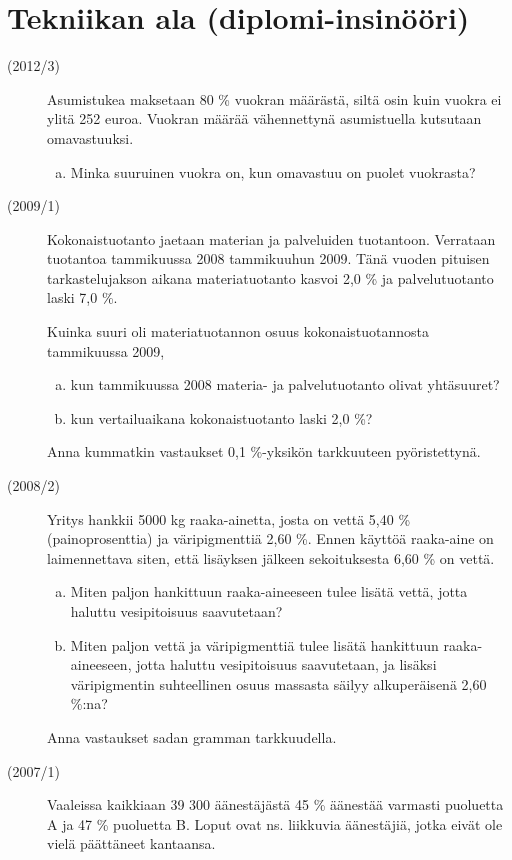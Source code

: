 \section{Tekniikan ala (diplomi-insinööri)}
\begin{description}
	\item[(2012/3)] Asumistukea maksetaan 80 \% vuokran määrästä, siltä osin kuin vuokra ei ylitä 252 euroa. Vuokran määrää vähennettynä asumistuella kutsutaan omavastuuksi.
		\begin{enumerate}[(a)]
			\item Minka suuruinen vuokra on, kun omavastuu on puolet vuokrasta?
		\end{enumerate}
	
	\item[(2009/1)] Kokonaistuotanto jaetaan materian ja palveluiden tuotantoon. Verrataan tuotantoa tammikuussa 2008 tammikuuhun 2009. Tänä vuoden pituisen tarkastelujakson aikana materiatuotanto kasvoi 2,0 \% ja palvelutuotanto laski 7,0 \%.
	
	Kuinka suuri oli materiatuotannon osuus kokonaistuotannosta tammikuussa 2009,
	\begin{enumerate}[(a)]
		\item kun tammikuussa 2008 materia- ja palvelutuotanto olivat yhtäsuuret?
		\item kun vertailuaikana kokonaistuotanto laski 2,0 \%?
	\end{enumerate}
	Anna kummatkin vastaukset 0,1 \%-yksikön tarkkuuteen pyöristettynä.

	\item[(2008/2)] Yritys hankkii 5000 kg raaka-ainetta, josta on vettä 5,40 \% (painoprosenttia) ja väripigmenttiä 2,60 \%. Ennen käyttöä raaka-aine on laimennettava siten, että lisäyksen jälkeen sekoituksesta 6,60 \% on vettä.
	
	\begin{enumerate}[(a)]
		\item Miten paljon hankittuun raaka-aineeseen tulee lisätä vettä, jotta haluttu vesipitoisuus saavutetaan?
		\item Miten paljon vettä ja väripigmenttiä tulee lisätä hankittuun raaka-aineeseen, jotta haluttu vesipitoisuus saavutetaan, ja lisäksi väripigmentin suhteellinen osuus massasta säilyy alkuperäisenä 2,60 \%:na?
	\end{enumerate}
	Anna vastaukset sadan gramman tarkkuudella.

	\item[(2007/1)] Vaaleissa kaikkiaan 39 300 äänestäjästä 45 \% äänestää varmasti puoluetta A ja 47 \% puoluetta B. Loput ovat ns. liikkuvia äänestäjiä, jotka eivät ole vielä päättäneet kantaansa.
	

\end{description}
